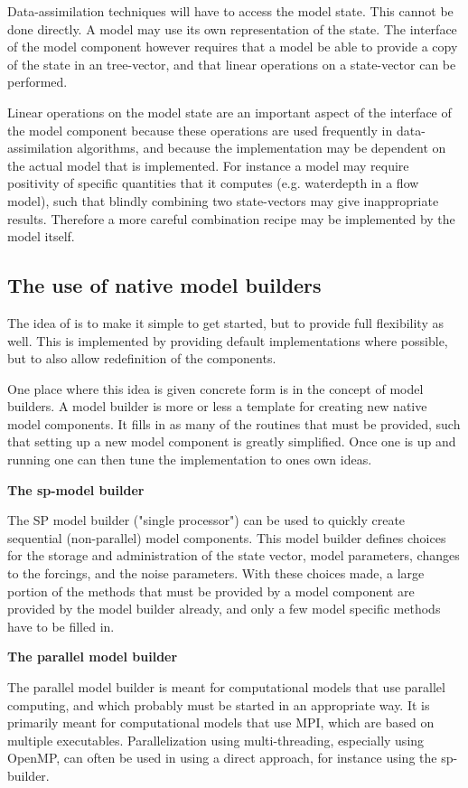 Data-assimilation techniques will have to access the model state. This cannot be done directly. A model may use its own representation of the state. The interface of the \oda model component however requires that a model be able to provide a copy of the state in an \oda tree-vector, and that linear operations on a state-vector can be performed.

Linear operations on the model state are an important aspect of the interface of the model component because these operations are used frequently in data-assimilation algorithms, and because the implementation may be dependent on the actual model that is implemented. For instance a model may require positivity of specific quantities that it computes (e.g. waterdepth in a flow model), such that blindly combining two state-vectors may give inappropriate results. Therefore a more careful combination recipe may be implemented by the model itself. 

\subsection{The use of native model builders}

The idea of \oda is to make it simple to get started, but to provide full flexibility as well. This is implemented by providing default implementations where possible, but to also allow redefinition of the \oda components.

One place where this idea is given concrete form is in the concept of model builders. A model builder is more or less a template for creating new native model components. It fills in as many of the routines that must be provided, such that setting up a new model component is greatly simplified. Once one is up and running one can then tune the implementation to ones own ideas.

\textbf{The sp-model builder}

The SP model builder ("single processor") can be used to quickly create sequential (non-parallel) model components. This model builder defines choices for the storage and administration of the state vector, model parameters, changes to the forcings, and the noise parameters. With these choices made, a large portion of the methods that must be provided by a model component are provided by the model builder already, and only a few model specific methods have to be filled in.

\textbf{The parallel model builder}

The parallel model builder is meant for computational models that use parallel computing, and which probably must be started in an appropriate way. It is primarily meant for computational models that use MPI, which are based on multiple executables. Parallelization using multi-threading, especially using OpenMP, can often be used in \oda using a direct approach, for instance using the sp-builder.

